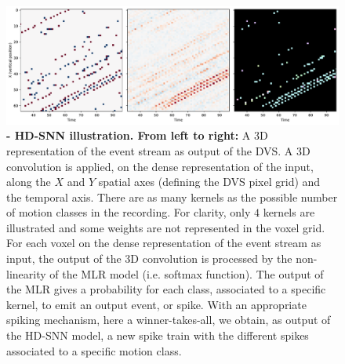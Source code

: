 \documentclass[default]{sn-jnl}%
\theoremstyle{thmstyleone}%
\theoremstyle{thmstyletwo}%
\theoremstyle{thmstylethree}%
\begin{document}
\begin{figure}%
    \centering
    \includegraphics[width=\linewidth]{figures/conv_HD-SNN.pdf}
    \caption{
    \textbf{- HD-SNN illustration. From left to right:} A 3D representation of the event stream as output of the DVS. A 3D convolution is applied, on the dense representation of the input, along the $X$ and $Y$ spatial axes (defining the DVS pixel grid) and the temporal axis. There are as many kernels as the possible number of motion classes in the recording. For clarity, only $4$ kernels are illustrated and some weights are not represented in the voxel grid. For each voxel on the dense representation of the event stream as input, the output of the 3D convolution is processed by the non-linearity of the MLR model (i.e. softmax function). The output of the MLR gives a probability for each class, associated to a specific kernel, to emit an output event, or spike. With an appropriate spiking mechanism, here a winner-takes-all, we obtain, as output of the HD-SNN model, a new spike train with the different spikes associated to a specific motion class. }
    \label{fig:model}
\end{figure}
\end{document}
